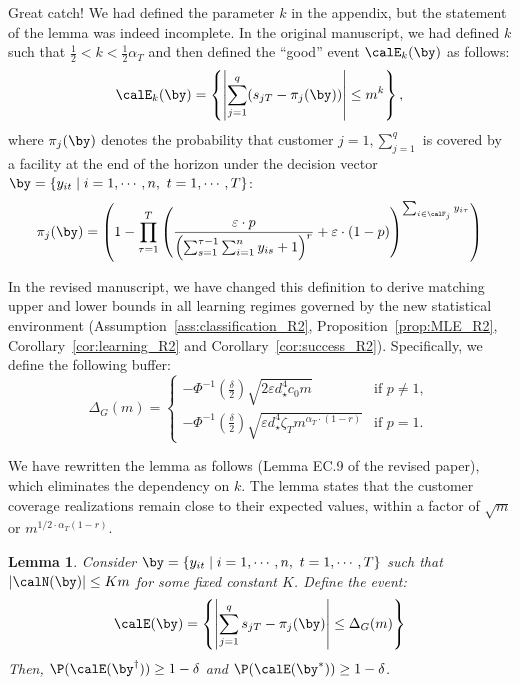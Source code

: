 \documentclass[11pt]{article}
\newtheorem{lemma}{Lemma}[]
\begin{document}
Great catch! We had defined the parameter $k$ in the appendix, but the statement of the lemma was indeed incomplete. In the original manuscript, we had defined $k$ such that $\frac{1}{2}<k<\frac{1}{2}\alpha_T$ and then defined the ``good'' event $\calE_k(\by)$ as follows:
\begin{equation*}
    \calE_k(\by)=\left\{\left|\sum_{j=1}^q (s_{jT} - \pi_{j}(\by))\right|\leq m^k\right\},
\end{equation*}
where $\pi_{j}(\by)$ denotes the probability that customer $j=1,\sum_{j=1}^q$ is covered by a facility at the end of the horizon under the decision vector $\by=\{y_{it}\mid i=1,\cdots,n,\ t=1,\cdots,T\}$:
\begin{equation*}
    \pi_{j}(\by)=\left(1-\prod_{\tau=1}^T \left(\frac{\varepsilon\cdot p}{\left(\sum_{s=1}^{\tau-1} \sum_{i=1}^n y_{is} +1\right)^r}+\varepsilon\cdot(1-p)\right)^{\sum_{i \in \calF_j} y_{i\tau}}\right)
\end{equation*}

In the revised manuscript, we have changed this definition to derive matching upper and lower bounds in all learning regimes governed by the new statistical environment (Assumption~\ref{ass:classification_R2}, Proposition~\ref{prop:MLE_R2}, Corollary~\ref{cor:learning_R2} and Corollary~\ref{cor:success_R2}). Specifically, we define the following buffer:
\begin{equation*}
	\Delta_G(m) = \begin{cases}
		-\Phi^{-1}\left(\frac{\delta}{2}\right)\sqrt{2\varepsilon d_\star^4 c_0 m}& \text{if }p\neq1,\\
			-\Phi^{-1}\left(\frac{\delta}{2}\right)\sqrt{\varepsilon d_\star^4 \zeta_T m^{\alpha_T \cdot (1-r)}}& \text{if }p =1.
	\end{cases}
\end{equation*}

We have rewritten the lemma as follows (Lemma EC.9 of the revised paper), which eliminates the dependency on $k$. The lemma states that the customer coverage realizations remain close to their expected values, within a factor of $\sqrt{m}$ or $m^{1/2\cdot\alpha_T(1-r)}$.
\renewcommand{\thelemma}{EC.9}
\begin{lemma}\label{lem:hoeffding_gen_bound_R2}
   Consider $\by=\{y_{it}\mid i=1,\cdots,n,\ t=1,\cdots,T\}$ such that $|\calN(\by)|\leq Km$ for some fixed constant $K$. Define the event:
   \begin{equation}
    \calE(\by)=\left\{\left|\sum_{j=1}^q s_{jT} - \pi_j(\by)\right|\leq \Delta_G(m)\right\}	\label{eq:Ek_gen_R2}
    \end{equation}
    Then, $\P(\calE(\by^\dagger))\geq 1-\delta$ and $\P(\calE(\by^*))\geq 1-\delta$.
\end{lemma}
\renewcommand{\thelemma}{\arabic{lemma}}
\end{document}
